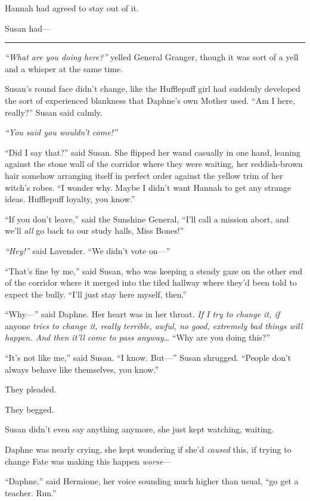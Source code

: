 Hannah had agreed to stay out of it.

Susan had---

\begin{center}\rule{3in}{0.4pt}\end{center}

\emph{``What are you doing here?''} yelled General Granger, though it
was sort of a yell and a whisper at the same time.

Susan's round face didn't change, like the Hufflepuff girl had suddenly
developed the sort of experienced blankness that Daphne's own Mother
used. ``Am I here, really?'' Susan said calmly.

\emph{``You said you wouldn't come!''}

``Did I say that?'' said Susan. She flipped her wand casually in one
hand, leaning against the stone wall of the corridor where they were
waiting, her reddish-brown hair somehow arranging itself in perfect
order against the yellow trim of her witch's robes. ``I wonder why.
Maybe I didn't want Hannah to get any strange ideas. Hufflepuff loyalty,
you know.''

``If you don't leave,'' said the Sunshine General, ``I'll call a mission
abort, and we'll \emph{all} go back to our study halls, Miss Bones!''

\emph{``Hey!''} said Lavender. ``We didn't vote on---''

``That's fine by me,'' said Susan, who was keeping a steady gaze on the
other end of the corridor where it merged into the tiled hallway where
they'd been told to expect the bully. ``I'll just stay here myself,
then.''

``Why---'' said Daphne. Her heart was in her throat. \emph{If I try to
change it, if} anyone \emph{tries to change it, really terrible, awful,
no good, extremely bad things will happen. And then it'll come to pass
anyway\ldots{}} ``Why are you doing this?''

``It's not like me,'' said Susan. ``I know. But---'' Susan shrugged.
``People don't always behave like themselves, you know.''

They pleaded.

They begged.

Susan didn't even say anything anymore, she just kept watching, waiting.

Daphne was nearly crying, she kept wondering if she'd \emph{caused}
this, if trying to change Fate was making this happen \emph{worse}---

``Daphne,'' said Hermione, her voice sounding much higher than usual,
``go get a teacher. Run.''

